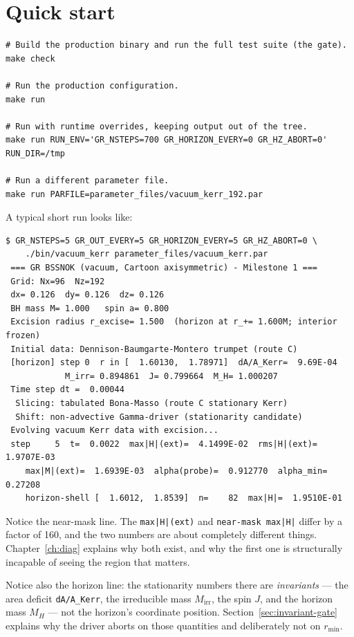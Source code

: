 \documentclass[11pt,openany]{book}
\begin{document}
\section{Quick start}

\begin{lstlisting}
# Build the production binary and run the full test suite (the gate).
make check

# Run the production configuration.
make run

# Run with runtime overrides, keeping output out of the tree.
make run RUN_ENV='GR_NSTEPS=700 GR_HORIZON_EVERY=0 GR_HZ_ABORT=0' RUN_DIR=/tmp

# Run a different parameter file.
make run PARFILE=parameter_files/vacuum_kerr_192.par
\end{lstlisting}

A typical short run looks like:

\begin{lstlisting}
$ GR_NSTEPS=5 GR_OUT_EVERY=5 GR_HORIZON_EVERY=5 GR_HZ_ABORT=0 \
    ./bin/vacuum_kerr parameter_files/vacuum_kerr.par
 === GR BSSNOK (vacuum, Cartoon axisymmetric) - Milestone 1 ===
 Grid: Nx=96  Nz=192
 dx= 0.126  dy= 0.126  dz= 0.126
 BH mass M= 1.000   spin a= 0.800
 Excision radius r_excise= 1.500  (horizon at r_+= 1.600M; interior frozen)
 Initial data: Dennison-Baumgarte-Montero trumpet (route C)
 [horizon] step 0  r in [  1.60130,  1.78971]  dA/A_Kerr=  9.69E-04
            M_irr= 0.894861  J= 0.799664  M_H= 1.000207
 Time step dt =  0.00044
  Slicing: tabulated Bona-Masso (route C stationary Kerr)
  Shift: non-advective Gamma-driver (stationarity candidate)
 Evolving vacuum Kerr data with excision...
 step     5  t=  0.0022  max|H|(ext)=  4.1499E-02  rms|H|(ext)=  1.9707E-03
    max|M|(ext)=  1.6939E-03  alpha(probe)=  0.912770  alpha_min= 0.27208
    horizon-shell [  1.6012,  1.8539]  n=    82  max|H|=  1.9510E-01
\end{lstlisting}

Notice the near-mask line. The \texttt{max|H|(ext)} and \texttt{near-mask
max|H|} differ by a factor of 160, and the two numbers are about completely
different things. Chapter~\ref{ch:diag} explains why both exist, and why the
first one is structurally incapable of seeing the region that matters.

Notice also the horizon line: the stationarity numbers there are
\emph{invariants} --- the area deficit \texttt{dA/A\_Kerr}, the irreducible
mass $M_{\mathrm{irr}}$, the spin $J$, and the horizon mass $M_H$ --- not the
horizon's coordinate position. Section~\ref{sec:invariant-gate} explains why
the driver aborts on those quantities and deliberately not on $r_{\min}$.
\end{document}
